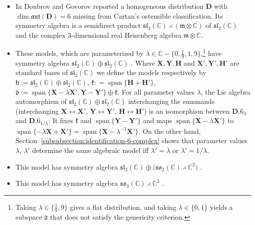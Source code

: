 \documentclass[pdftex]{sigma}
\DeclareMathOperator{\spanOperator}{span}
\newcommand{\Span}[1]{\spanOperator\{{#1}\}}
\newcommand{\bbC}{\mathbb{C}}
\newcommand{\mbD}{\mathbf{D}}
\newcommand{\mbH}{\mathbf{H}}
\newcommand{\mbX}{\mathbf{X}}
\newcommand{\mbY}{\mathbf{Y}}
\newcommand{\mfd} {\mathfrak{d}}
\newcommand{\mfh} {\mathfrak{h}}
\newcommand{\mfk} {\mathfrak{k}}
\newcommand{\mfm} {\mathfrak{m}}
\newcommand{\mfaut}{\mathfrak{aut}}
\newcommand{\mfsl} {\mathfrak{sl}}
\newcommand{\mfso} {\mathfrak{so}}
\numberwithin{equation}{section}
\begin{document}
\begin{itemize}[leftmargin=1.5cm]\itemsep=0pt
\item[\textbf{$\mathbf{N.6}$}] In \cite{DoubrovGovorovCounterexample} Doubrov and Govorov reported a homogeneous distribution $\mbD$ with $\dim \mfaut(\mbD) = 6$ missing from Cartan's ostensible classification. Its symmetry algebra is a semidirect product $\mfsl_2(\bbC) \rightthreetimes (\mfm \otimes \bbC)$ of $\mfsl_2(\bbC)$ and the complex $3$-dimensional real Heisenberg algebra $\mfm \otimes \bbC$.
\item[\textbf{$\mathbf{D.6}_{\lambda}$}] These models, which are parameterized by $\lambda \in \bbC - \{ 0, \frac{1}{9}, 1, 9 \}$,\footnote{Taking $\lambda \in \{\frac{1}{9}, 9\}$ gives a flat distribution, and taking $\lambda \in \{0, 1\}$ yields a subspace $\mfd$ that does not satisfy the genericity criterion.} have symmetry algebra $\mfsl_2(\bbC) \oplus \mfsl_2(\bbC)$ \cite[Section~50]{CartanFiveVariables}. Where $\mbX, \mbY, \mbH$ and $\mbX', \mbY', \mbH'$ are standard bases of $\mfsl_2(\bbC)$ we define the models respectively by $\mfh := \mfsl_2(\bbC) \oplus \mfsl_2(\bbC)$, $\mfk: = \Span{\mbH + \mbH'}$, $\mfd := \Span{\mbX - \lambda \mbX', \mbY - \mbY'} \oplus \mfk$. For all parameter values $\lambda$, the Lie algebra automorphism of $\mfsl_2(\bbC) \oplus \mfsl_2(\bbC)$ interchanging the summands (interchanging $\mbX \leftrightarrow \mbX'$, $\mbY \leftrightarrow \mbY'$, $\mbH \leftrightarrow \mbH'$) is an isomorphism between $\mathbf{D.6}_{\lambda}$ and $\mathbf{D.6}_{1 / \lambda}$: It fixes $\mfk$ and $\Span{\mbY - \mbY'}$ and maps $\Span{\mbX - \lambda \mbX'}$ to $\Span{-\lambda \mbX + \mbX'} = \Span{\mbX - \lambda^{-1} \mbX'}$. On the other hand, Section~\ref{subsubsection:identification-6-complex} shows that parameter values $\lambda$, $\lambda'$ determine the same algebraic model iff $\lambda' = \lambda$ or $\lambda' = 1 / \lambda$.
\item[\textbf{$\mathbf{D.6}_{\infty}$}] This model has symmetry algebra $\mfsl_2(\bbC) \oplus \big(\mfso_2(\bbC) \rightthreetimes \bbC^2\big)$ \cite[Section~51]{CartanFiveVariables}.
\item[\textbf{$\mathbf{D.6}_{\ast}$}] This model has symmetry algebra $\mfso_3(\bbC) \rightthreetimes \bbC^3$ \cite[Section~52]{CartanFiveVariables}.
\end{itemize}
\end{document}
